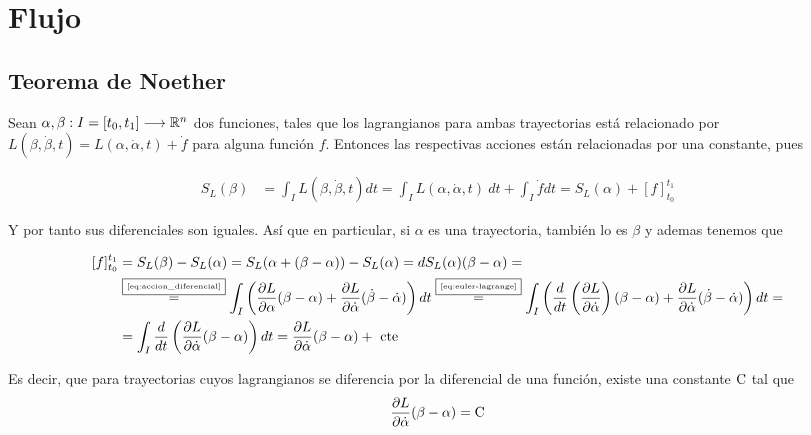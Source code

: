 \chapter{Flujo}
\section{Teorema de Noether}

Sean $\alpha,\beta:I=[t_0, t_1]\longrightarrow \mathbb{R}^n$ dos funciones, tales que los lagrangianos para ambas trayectorias está relacionado por $L(\beta, \dot{\beta}, t) = L(\alpha, \dot{\alpha}, t)+\dot{f}$ para alguna función $f$.
Entonces las respectivas acciones están relacionadas por una constante, pues

\begin{equation}
	\label{eq:variacion-accion}
	\begin{split}
		S_L(\beta) & = \int_I L(\beta, \dot{\beta}, t) dt = \int_I L(\alpha, \dot{\alpha}, t)\ dt+\int_I \dot{f}dt=S_L(\alpha) +[f]_{t_0}^{t_1}
	\end{split}
\end{equation}

Y por tanto sus diferenciales son iguales.
Así que en particular, si $\alpha$ es una trayectoria, también lo es $\beta$ y ademas tenemos que

\begin{equation}
	\label{eq:diferencial_trayectoria}
	\begin{split}
	[f]
		_{t_0}^{t_1} &= S_L(\beta) - S_L(\alpha) = S_L(\alpha + (\beta-\alpha))-S_L(\alpha)=dS_L(\alpha)(\beta-\alpha)=\\
		&\overset{\fbox{\tiny \ref{eq:accion_diferencial}}}{=}\int_{I}\left( \frac{\partial L}{\partial\alpha}(\beta-\alpha)+\frac{\partial L}{\partial\dot{\alpha}}(\dot{\beta}-\dot{\alpha})\right) dt\overset{\fbox{\tiny \ref{eq:euler-lagrange}}}{=}\int_{I}\left( \frac{d}{dt}\left(\frac{\partial L}{\partial\dot{\alpha}}\right)(\beta-\alpha)+\frac{\partial L}{\partial\dot{\alpha}}(\dot{\beta}-\dot{\alpha})\right) dt=\\
		&=\int_{I}\frac{d}{dt}\left(\frac{\partial L}{\partial\dot{\alpha}}(\beta-\alpha)\right) dt = \frac{\partial L}{\partial\dot{\alpha}}(\beta-\alpha) + \text{ cte }
	\end{split}
\end{equation}

Es decir, que para trayectorias cuyos lagrangianos se diferencia por la diferencial de una función, existe una constante $\text{\rmfamily\upshape C}$ tal que
\begin{equation}
	\label{eq:flujo_noether_para_trayectorias}
	\frac{\partial L}{\partial\dot{\alpha}}(\beta-\alpha) = \text{\rmfamily\upshape C}
\end{equation}

